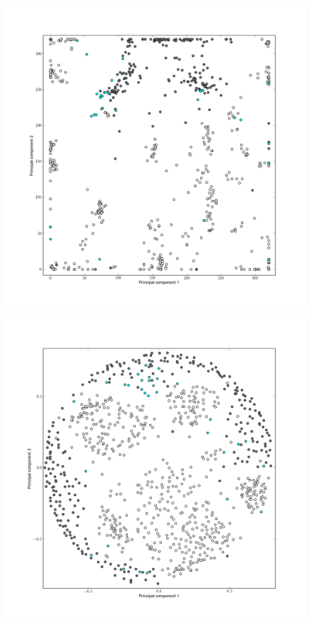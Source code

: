 \begin{figure}[H]
	\begin{minipage}{0.50\textwidth}
	\includegraphics[trim=3cm 3cm 2cm 2cm,clip,width=\textwidth]{./img/SOM_norm.png}
	\label{figSOMnorm}
	\end{minipage}
	\begin{minipage}{0.50\textwidth}
	\includegraphics[trim=3cm 3cm 2cm 2cm,clip, width=\textwidth]{./img/MDS_cosine_norm.png}

\end{minipage}
\end{figure}
